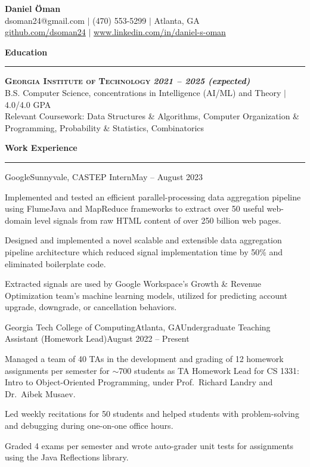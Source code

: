 \documentclass{article}
\newcommand{\horizontal}{\vspace{2pt}\hrule}
\newcommand{\school}[3]{\vspace{2pt}\textsc{\textbf{#1}} \hfill \textbf{\textit{#2}} \\ #3}
\newcommand{\sectitle}[1]{\vspace{2pt} \textbf{\large #1} \horizontal}
\begin{document}
\thispagestyle{empty}
\begin{center}
    \textbf{\LARGE Daniel Öman} \\
    dsoman24@gmail.com $|$ (470) 553-5299 $|$ Atlanta, GA \\
    \href{https://github.com/dsoman24}{github.com/dsoman24} $|$ \href{https://www.linkedin.com/in/daniel-s-oman/}{www.linkedin.com/in/daniel-s-oman}
\end{center}

\begin{flushleft}
\sectitle{Education}

\school{Georgia Institute of Technology}{2021 -- 2025 (expected)}
{B.S. Computer Science, concentrations in Intelligence (AI/ML) and Theory $|$ 4.0/4.0 GPA \\ Relevant Coursework: Data Structures \& Algorithms, Computer Organization \& Programming, Probability \& Statistics, Combinatorics}

\sectitle{Work Experience}

    \begin{experience}{Google}{Sunnyvale, CA}{STEP Intern}{May -- August 2023}
        \item Implemented and tested an efficient parallel-processing data aggregation pipeline using FlumeJava and MapReduce frameworks to extract over 50 useful web-domain level signals from  raw HTML content of over 250 billion web pages.
        \item Designed and implemented a novel scalable and extensible data aggregation pipeline architecture which reduced signal implementation time by 50\% and eliminated boilerplate code.
        \item Extracted signals are used by Google Workspace's Growth \& Revenue Optimization team's machine learning models, utilized for predicting account upgrade, downgrade, or cancellation behaviors.
    \end{experience}

    \begin{experience}{Georgia Tech College of Computing}{Atlanta, GA}{Undergraduate Teaching Assistant (Homework Lead)}{August 2022 -- Present}
        \item Managed a team of 40 TAs in the development and grading of 12 homework assignments per semester for $\sim$700 students as TA Homework Lead for CS 1331: Intro to Object-Oriented Programming, under Prof.~Richard Landry and Dr.~Aibek Musaev.
        \item Led weekly recitations for 50 students and helped students with problem-solving and debugging during one-on-one office hours.
        \item Graded 4 exams per semester and wrote auto-grader unit tests for assignments using the Java Reflections library.
    \end{experience}


\end{flushleft}
\end{document}
